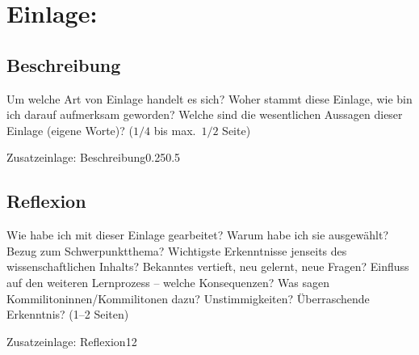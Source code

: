 \section{Einlage: }
\label{sec:zusatz1}

\subsection{Beschreibung}
\begin{hinweise}
Um welche Art von Einlage handelt es sich? Woher stammt diese Einlage, wie bin ich darauf aufmerksam
geworden? Welche sind die wesentlichen Aussagen dieser Einlage (eigene Worte)? ($1/4$ bis max.\ $1/2$ Seite)
\end{hinweise}
\begin{umfang}{Zusatzeinlage: Beschreibung}{0.25}{0.5}
\end{umfang}


\subsection{Reflexion}
\begin{hinweise}
Wie habe ich mit dieser Einlage gearbeitet? Warum habe ich sie ausgewählt? Bezug zum Schwerpunktthema?
Wichtigste Erkenntnisse jenseits des wissenschaftlichen Inhalts? Bekanntes vertieft, neu gelernt, neue Fragen?
Einfluss auf den weiteren Lernprozess -- welche Konsequenzen? Was sagen Kommilitoninnen/Kommilitonen dazu?
Unstimmigkeiten? Überraschende Erkenntnis? (1--2 Seiten)
\end{hinweise}
\begin{umfang}{Zusatzeinlage: Reflexion}{1}{2}
\end{umfang}
